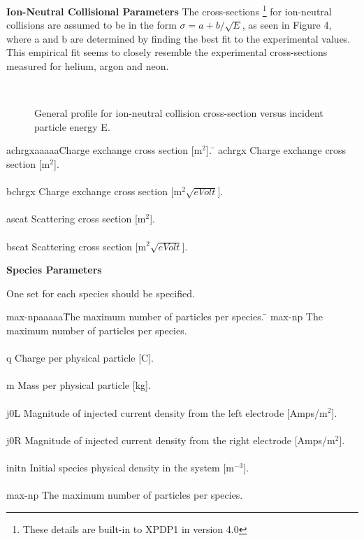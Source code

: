 \begin{section}
\begin{subsection}
\begin{subsubsection} {\bf Ion-Neutral Collisional Parameters}
      The cross-sections \footnote{These details are built-in to XPDP1 
in version 4.0} for ion-neutral collisions are assumed to be
in the form $\sigma = a + b / \sqrt{E}$, as seen in Figure 4, where a
and b are determined by finding the best fit to the experimental
values.  This empirical fit seems to closely resemble the experimental
cross-sections measured for helium, argon and neon.
%
\begin{figure}
\begin{center}
\leavevmode
\hbox{%
\epsfysize 4.0in
\epsfxsize 4.0in
}
\end{center}
\caption{
General profile for ion-neutral collision cross-section versus incident particle energy E.
}
\label{IXSECXN}
\end{figure}
%
\noindent
\begin{tabbing}
      achrgxaaaaa\= Charge exchange cross section [m$^{2}$]. \= \kill
      achrgx \> Charge exchange cross section [m$^{2}$]. \> \\
\\ bchrgx \> Charge exchange cross section [m$^{2} \sqrt{e Volt}$].
\> \\ 							\\ ascat \>
Scattering cross section [m$^{2}$]. \> \\
\\ bscat \> Scattering cross section [m$^{2} \sqrt{e Volt}$]. \>
\end{tabbing}
\end{subsubsection}

\begin{subsubsection}
{\bf Species Parameters}

      One set for each species should be specified.

\begin{tabbing}
      max-npaaaaa\= The maximum number of particles per species. \= \kill
      max-np \> The maximum number of particles per species. \> \\
\\ q \> Charge per physical particle [C]. \> \\
\\ m \> Mass per physical particle [kg]. \> \\
\\ j0L \> Magnitude of injected current density from the left
electrode [Amps/m$^{2}$]. \> \\
\\ j0R \> Magnitude of injected current density from the right
electrode [Amps/m$^{2}$]. \> \\
\\ initn \> Initial species physical density in the system [m$^{-3}$].
\> \\
\\ max-np \> The maximum number of particles per species. \>


\end{tabbing}
\end{subsubsection}
\end{subsection}
\end{section}

